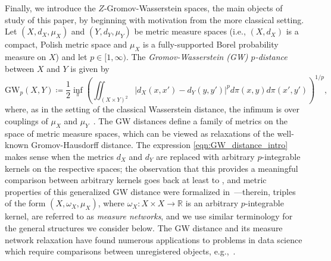 \documentclass{article}
\theoremstyle{definition}
\newcommand{\R}{\mathbb{R}}
\begin{document}
\smallskip

 Finally, we introduce the $Z$-Gromov-Wasserstein spaces, the main objects of study of this paper, by beginning with motivation from the more classical setting. Let $(X,d_X,\mu_X)$ and $(Y,d_Y,\mu_Y)$ be metric measure spaces (i.e., $(X,d_X)$ is a compact, Polish metric space and $\mu_X$ is a fully-supported Borel probability measure on $X$) and let $p \in [1,\infty)$. The \emph{Gromov-Wasserstein (GW) $p$-distance} between $X$ and $Y$ is given by 
\begin{equation}\label{eqn:GW_distance_intro}
\mathrm{GW}_p(X,Y) \coloneqq \frac{1}{2} \inf_\pi \left(\iint_{(X \times Y)^2} |d_X(x,x') - d_Y(y,y')|^p d\pi(x,y)d\pi(x',y')\right)^{1/p},
\end{equation}
where, as in the setting of the classical Wasserstein distance, the infimum is over couplings of $\mu_X$ and $\mu_Y$~\cite{Memoli_2007,Memoli2011GromovWasserstein}. The GW distances define a family of metrics on the space of metric measure spaces, which can be viewed as relaxations of the well-known Gromov-Hausdorff distance. The expression \eqref{eqn:GW_distance_intro} makes sense when the metrics $d_X$ and $d_Y$ are replaced with arbitrary $p$-integrable kernels on the respective spaces; the observation that this provides a meaningful comparison between arbitrary kernels goes back at least to \cite{peyre2016gromov}, and metric properties of this generalized GW distance were formalized in~\cite{chowdhury2019gromovwassersteindistancenetworksstable}---therein, triples of the form $(X,\omega_X,\mu_X)$, where $\omega_X:X \times X \to \R$ is an arbitrary $p$-integrable kernel, are referred to as \emph{measure networks}, and we use similar terminology for the general structures we consider below. The GW distance and its measure network relaxation have found numerous applications to problems in data science which require comparisons between unregistered objects, e.g.,~\cite{peyre2016gromov,xu2019scalable,chowdhury2020gromov,chowdhury2021generalized,demetci2022scot}.
\end{document}
